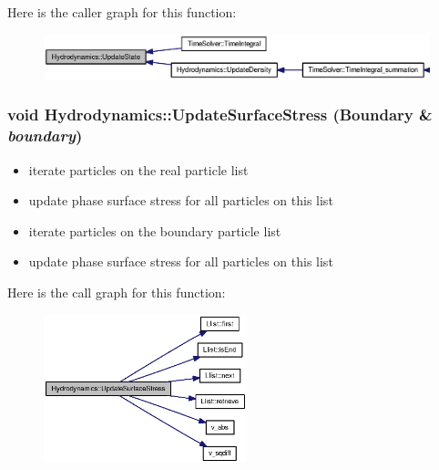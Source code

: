 Here is the caller graph for this function:\nopagebreak
\begin{figure}[H]
\begin{center}
\leavevmode
\includegraphics[width=332pt]{classHydrodynamics_1698dbe8ecc0e730319de5d7eca7a891_icgraph}
\end{center}
\end{figure}
\hypertarget{classHydrodynamics_f5b2c4ad14824e4b6192faa6f60f4014}{
\subsubsection[{UpdateSurfaceStress}]{\setlength{\rightskip}{0pt plus 5cm}void Hydrodynamics::UpdateSurfaceStress ({\bf Boundary} \& {\em boundary})}}
\label{classHydrodynamics_f5b2c4ad14824e4b6192faa6f60f4014}




\begin{itemize}
\item iterate particles on the real particle list\end{itemize}


\begin{itemize}
\item update phase surface stress for all particles on this list\end{itemize}


\begin{itemize}
\item iterate particles on the boundary particle list\end{itemize}


\begin{itemize}
\item update phase surface stress for all particles on this list \end{itemize}


Here is the call graph for this function:\nopagebreak
\begin{figure}[H]
\begin{center}
\leavevmode
\includegraphics[width=167pt]{classHydrodynamics_f5b2c4ad14824e4b6192faa6f60f4014_cgraph}
\end{center}
\end{figure}


